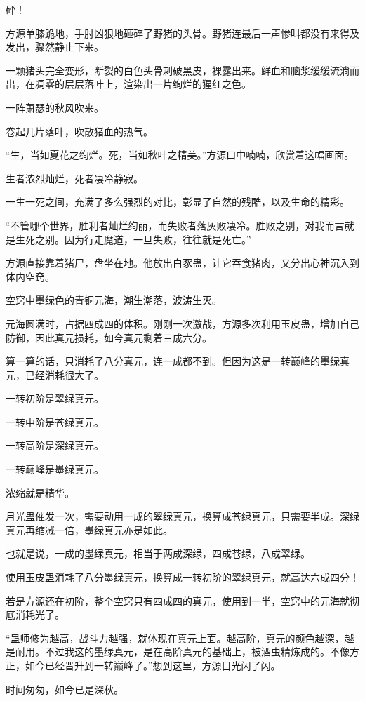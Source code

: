 \begin{this_body}
砰！

方源单膝跪地，手肘凶狠地砸碎了野猪的头骨。野猪连最后一声惨叫都没有来得及发出，骤然静止下来。

一颗猪头完全变形，断裂的白色头骨刺破黑皮，裸露出来。鲜血和脑浆缓缓流淌而出，在凋零的层层落叶上，渲染出一片绚烂的猩红之色。

一阵萧瑟的秋风吹来。

卷起几片落叶，吹散猪血的热气。

“生，当如夏花之绚烂。死，当如秋叶之精美。”方源口中喃喃，欣赏着这幅画面。

生者浓烈灿烂，死者凄冷静寂。

一生一死之间，充满了多么强烈的对比，彰显了自然的残酷，以及生命的精彩。

“不管哪个世界，胜利者灿烂绚丽，而失败者落灰败凄冷。胜败之别，对我而言就是生死之别。因为行走魔道，一旦失败，往往就是死亡。”

方源直接靠着猪尸，盘坐在地。他放出白豕蛊，让它吞食猪肉，又分出心神沉入到体内空窍。

空窍中墨绿色的青铜元海，潮生潮落，波涛生灭。

元海圆满时，占据四成四的体积。刚刚一次激战，方源多次利用玉皮蛊，增加自己防御，因此真元损耗，如今真元剩着三成六分。

算一算的话，只消耗了八分真元，连一成都不到。但因为这是一转巅峰的墨绿真元，已经消耗很大了。

一转初阶是翠绿真元。

一转中阶是苍绿真元。

一转高阶是深绿真元。

一转巅峰是墨绿真元。

浓缩就是精华。

月光蛊催发一次，需要动用一成的翠绿真元，换算成苍绿真元，只需要半成。深绿真元再缩减一倍，墨绿真元亦是如此。

也就是说，一成的墨绿真元，相当于两成深绿，四成苍绿，八成翠绿。

使用玉皮蛊消耗了八分墨绿真元，换算成一转初阶的翠绿真元，就高达六成四分！

若是方源还在初阶，整个空窍只有四成四的真元，使用到一半，空窍中的元海就彻底消耗光了。

“蛊师修为越高，战斗力越强，就体现在真元上面。越高阶，真元的颜色越深，越是耐用。不过我这的墨绿真元，是在高阶真元的基础上，被酒虫精炼成的。不像方正，如今已经晋升到一转巅峰了。”想到这里，方源目光闪了闪。

时间匆匆，如今已是深秋。


\end{this_body}
